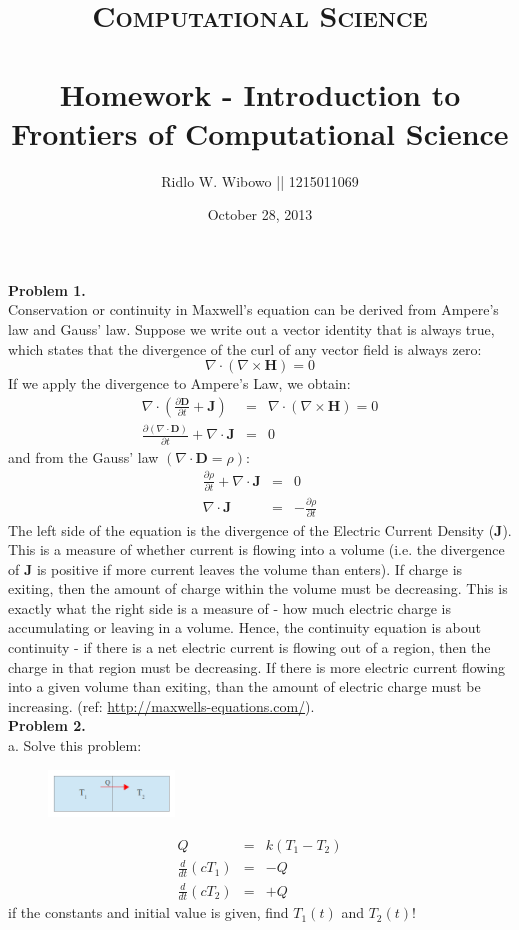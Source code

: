 \documentclass[paper=a4, fontsize=11pt]{scrartcl}
\title{	
\normalfont \normalsize 
\textsc{Computational Science} \\ [25pt] %
\horrule{0.5pt} \\[0.2cm] %
\small Homework - Introduction to Frontiers of Computational Science\\ %
}
\author{\small{Ridlo W. Wibowo || 1215011069}} %
\date{\small October 28, 2013} %
\numberwithin{equation}{section} %
\numberwithin{figure}{section} %
\numberwithin{table}{section} %
\begin{document}
\maketitle %

\textbf{Problem 1.}\\
Conservation or continuity in Maxwell's equation can be derived from Ampere's law and Gauss' law. Suppose we write out a vector identity that is always true, which states that the divergence of the curl of any vector field is always zero:
\begin{equation*}
\nabla \cdot ( \nabla \times \textbf{H} ) = 0
\end{equation*}
If we apply the divergence to Ampere's Law, we obtain:
\begin{eqnarray*}
\nabla \cdot \left( \frac{\partial \textbf{D}}{\partial t} + \textbf{J} \right) &=& \nabla \cdot ( \nabla \times \textbf{H} ) = 0\\
\frac{\partial (\nabla \cdot \textbf{D})}{\partial t} + \nabla \cdot \textbf{J} &=& 0
\end{eqnarray*}
and from the Gauss' law $(\nabla \cdot \textbf{D} = \rho)$:
\begin{eqnarray*}
\frac{\partial \rho}{\partial t} + \nabla \cdot \textbf{J} &=& 0\\
\nabla \cdot \textbf{J} &=& -\frac{\partial \rho}{\partial t} 
\end{eqnarray*}
The left side of the equation is the divergence of the Electric Current Density ($\textbf{J}$). This is a measure of whether current is flowing into a volume (i.e. the divergence of $\textbf{J}$ is positive if more current leaves the volume than enters). If charge is exiting, then the amount of charge within the volume must be decreasing. This is exactly what the right side is a measure of - how much electric charge is accumulating or leaving in a volume. Hence, the continuity equation is about continuity - if there is a net electric current is flowing out of a region, then the charge in that region must be decreasing. If there is more electric current flowing into a given volume than exiting, than the amount of electric charge must be increasing. (ref: \url{http://maxwells-equations.com/}).\\


\textbf{Problem 2.}\\
a. Solve this problem:
\begin{figure}
	\centering
	\includegraphics[width=0.3\textwidth]{2a.png}
\end{figure}
\begin{eqnarray*}
Q &=& k (T_1 - T_2)\\
\frac{d}{dt}(cT_1) &=& -Q\\
\frac{d}{dt}(cT_2) &=& +Q
\end{eqnarray*}
if the constants and initial value is given, find $T_1(t)$ and $T_2(t)$!\\
\end{document}

